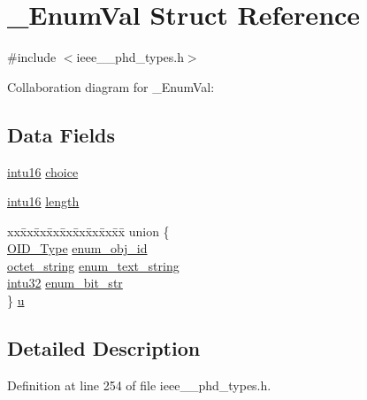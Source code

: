 \hypertarget{struct___enum_val}{}\section{\+\_\+\+Enum\+Val Struct Reference}
\label{struct___enum_val}


{\ttfamily \#include $<$ieee\+\_\+\_\+phd\+\_\+types.\+h$>$}



Collaboration diagram for \+\_\+\+Enum\+Val\+:
\subsection*{Data Fields}
\begin{DoxyCompactItemize}
\item 
\hyperlink{ieee__11073__phd__types_8h_a3561595d2aa7416532e1c9910abd076d}{intu16} \hyperlink{struct___enum_val_a034761fd73babd925f56cbb254ce4fb2}{choice}
\item 
\hyperlink{ieee__11073__phd__types_8h_a3561595d2aa7416532e1c9910abd076d}{intu16} \hyperlink{struct___enum_val_a3743679e4ff85e3e1b3fc2e59973fbb3}{length}
\item 
\begin{tabbing}
xx\=xx\=xx\=xx\=xx\=xx\=xx\=xx\=xx\=\kill
union \{\\
\>\hyperlink{ieee__11073__phd__types_8h_aa4d7af235d4a95d6632aa0d64160dd62}{OID\_Type} \hyperlink{struct___enum_val_af27a89b9e915ac703bba2f71e8e229d7}{enum\_obj\_id}\\
\>\hyperlink{ieee__11073__phd__types_8h_a5524261dd425fc0bd90c9d87277b7127}{octet\_string} \hyperlink{struct___enum_val_acdf1fca8a0a0e3269df2cba7026aa241}{enum\_text\_string}\\
\>\hyperlink{ieee__11073__phd__types_8h_a22fd02d9fb90b079261a56b300e7f3c1}{intu32} \hyperlink{struct___enum_val_aa58b7fc28d562df902f32bc0007d3f7f}{enum\_bit\_str}\\
\} \hyperlink{struct___enum_val_ab1914d275d8e14bfe2acfdfed8a3f339}{u}\\

\end{tabbing}\end{DoxyCompactItemize}


\subsection{Detailed Description}


Definition at line 254 of file ieee\+\_\+\_\+phd\+\_\+types.\+h.



